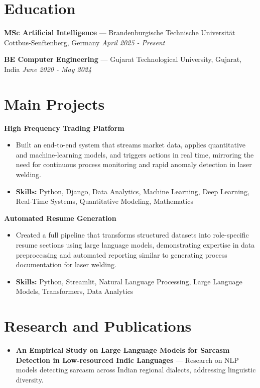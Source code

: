 \documentclass[a4paper,10pt]{article}
\begin{document}
\section*{Education}
\textbf{MSc Artificial Intelligence} — Brandenburgische Technische Universität Cottbus-Senftenberg, Germany \hfill \textit{April 2025 - Present}\par
\vspace{1.5pt}
\textbf{BE Computer Engineering} — Gujarat Technological University, Gujarat, India \hfill \textit{June 2020 - May 2024}\par

\section*{Main Projects}
\textbf{High Frequency Trading Platform}\par
\vspace{1pt}
\begin{itemize}
  \item Built an end-to-end system that streams market data, applies quantitative and machine-learning models, and triggers actions in real time, mirroring the need for continuous process monitoring and rapid anomaly detection in laser welding.
  \item \textbf{Skills:} Python, Django, Data Analytics, Machine Learning, Deep Learning, Real-Time Systems, Quantitative Modeling, Mathematics
\end{itemize}
\vspace{3pt}
\textbf{Automated Resume Generation}\par
\vspace{1pt}
\begin{itemize}
  \item Created a full pipeline that transforms structured datasets into role-specific resume sections using large language models, demonstrating expertise in data preprocessing and automated reporting similar to generating process documentation for laser welding.
  \item \textbf{Skills:} Python, Streamlit, Natural Language Processing, Large Language Models, Transformers, Data Analytics
\end{itemize}

\section*{Research and Publications}
\begin{itemize}
\item \textbf{An Empirical Study on Large Language Models for Sarcasm Detection in Low-resourced Indic Languages} — Research on NLP models detecting sarcasm across Indian regional dialects, addressing linguistic diversity.
\end{itemize}
\end{document}
